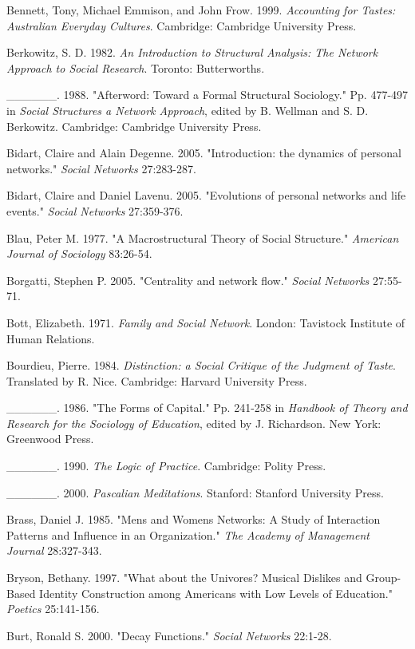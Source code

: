 Bennett, Tony, Michael Emmison, and John Frow. 1999. \emph{Accounting for Tastes: Australian Everyday Cultures}. Cambridge: Cambridge University Press.

Berkowitz, S. D. 1982. \emph{An Introduction to Structural Analysis: The Network Approach to Social Research}. Toronto: Butterworths.

\_\_\_\_\_\_. 1988. "Afterword: Toward a Formal Structural Sociology." Pp. 477-497 in \emph{Social Structures a Network Approach}, edited by B. Wellman and S. D. Berkowitz. Cambridge: Cambridge University Press.

Bidart, Claire and Alain Degenne. 2005. "Introduction: the dynamics of personal networks." \emph{Social Networks} 27:283-287.

Bidart, Claire and Daniel Lavenu. 2005. "Evolutions of personal networks and life events." \emph{Social Networks} 27:359-376.

Blau, Peter M. 1977. "A Macrostructural Theory of Social Structure." \emph{American Journal of Sociology} 83:26-54.

Borgatti, Stephen P. 2005. "Centrality and network flow." \emph{Social Networks} 27:55-71.

Bott, Elizabeth. 1971. \emph{Family and Social Network}. London: Tavistock Institute of Human Relations.

Bourdieu, Pierre. 1984. \emph{Distinction: a Social Critique of the Judgment of Taste}. Translated by R. Nice. Cambridge: Harvard University Press.

\_\_\_\_\_\_. 1986. "The Forms of Capital." Pp. 241-258 in \emph{Handbook of Theory and Research for the Sociology of Education}, edited by J. Richardson. New York: Greenwood Press.

\_\_\_\_\_\_. 1990. \emph{The Logic of Practice}. Cambridge: Polity Press.

\_\_\_\_\_\_. 2000. \emph{Pascalian Meditations}. Stanford: Stanford University Press.

Brass, Daniel J. 1985. "Men\textquotesingle s and Women\textquotesingle s Networks: A Study of Interaction Patterns and Influence in an Organization." \emph{The Academy of Management Journal} 28:327-343.

Bryson, Bethany. 1997. "What about the Univores? Musical Dislikes and Group-Based Identity Construction among Americans with Low Levels of Education." \emph{Poetics} 25:141-156.

Burt, Ronald S. 2000. "Decay Functions." \emph{Social Networks} 22:1-28.

